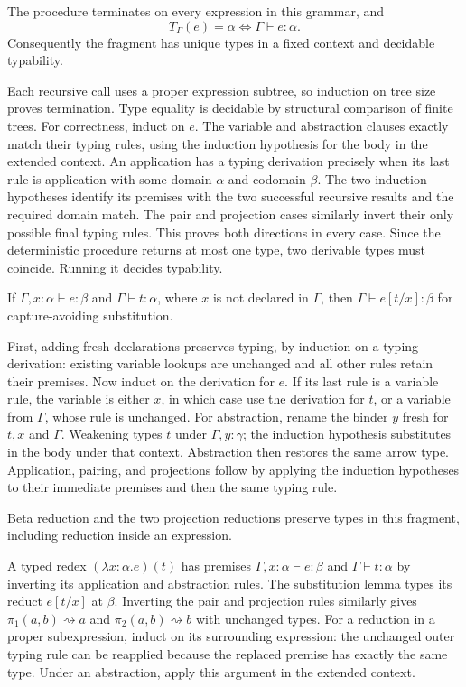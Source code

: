 \begin{theorem}
The procedure terminates on every expression in this grammar, and
\[
T_\Gamma(e)=\alpha\iff\Gamma\vdash e:\alpha.
\]
Consequently the fragment has unique types in a fixed context and
decidable typability.
\end{theorem}
\Proof
Each recursive call uses a proper expression subtree, so induction on
tree size proves termination. Type equality is decidable by structural
comparison of finite trees. For correctness, induct on $e$.
The variable and abstraction clauses exactly match their typing rules,
using the induction hypothesis for the body in the extended context.
An application has a typing derivation precisely when its last rule is
application with some domain $\alpha$ and codomain $\beta$. The two
induction hypotheses identify its premises with the two successful
recursive results and the required domain match. The pair and projection
cases similarly invert their only possible final typing rules. This
proves both directions in every case. Since the deterministic procedure
returns at most one type, two derivable types must coincide. Running it
decides typability.
\Done

\begin{lemma}
If $\Gamma,x:\alpha\vdash e:\beta$ and $\Gamma\vdash t:\alpha$,
where $x$ is not declared in $\Gamma$, then
$\Gamma\vdash e[t/x]:\beta$ for capture-avoiding substitution.
\end{lemma}
\Proof
First, adding fresh declarations preserves typing, by induction on a
typing derivation: existing variable lookups are unchanged and all other
rules retain their premises. Now induct on the derivation for $e$.
If its last rule is a variable rule, the variable is either $x$, in which
case use the derivation for $t$, or a variable from $\Gamma$, whose rule
is unchanged. For abstraction, rename the binder $y$ fresh for $t,x$
and $\Gamma$. Weakening types $t$ under $\Gamma,y:\gamma$; the induction
hypothesis substitutes in the body under that context. Abstraction then
restores the same arrow type. Application, pairing, and projections
follow by applying the induction hypotheses to their immediate premises
and then the same typing rule.
\Done

\begin{theorem}
Beta reduction and the two projection reductions preserve types in this
fragment, including reduction inside an expression.
\end{theorem}
\Proof
A typed redex $(\lambda x:\alpha.e)(t)$ has premises
$\Gamma,x:\alpha\vdash e:\beta$ and $\Gamma\vdash t:\alpha$ by
inverting its application and abstraction rules. The substitution lemma
types its reduct $e[t/x]$ at $\beta$. Inverting the pair and projection
rules similarly gives $\pi_1(a,b)\rightsquigarrow a$ and
$\pi_2(a,b)\rightsquigarrow b$ with unchanged types.
For a reduction in a proper subexpression, induct on its surrounding
expression: the unchanged outer typing rule can be reapplied because
the replaced premise has exactly the same type. Under an abstraction,
apply this argument in the extended context.
\Done

